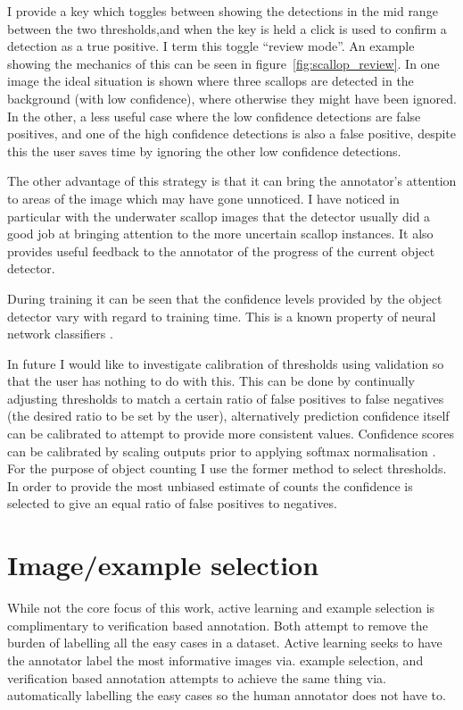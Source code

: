 I provide a key which toggles between showing the detections in the mid range between the two thresholds,and when the key is held a click is used to confirm a detection as a true positive. I term this toggle ``review mode''.  An example showing the mechanics of this can be seen in figure~\ref{fig:scallop_review}. In one image the ideal situation is shown where three scallops are detected in the background (with low confidence), where otherwise they might have been ignored. In the other, a less useful case where the low confidence detections are false positives, and one of the high confidence detections is also a false positive, despite this the user saves time by ignoring the other low confidence detections.

The other advantage of this strategy is that it can bring the annotator's attention to areas of the image which may have gone unnoticed. I have noticed in particular with the underwater scallop images that the detector usually did a good job at bringing attention to the more uncertain scallop instances. It also provides useful feedback to the annotator of the progress of the current object detector. 

During training it can be seen that the confidence levels provided by the object detector vary with regard to training time. This is a known property of neural network classifiers \cite{Guo2017}.

In future I would like to investigate calibration of thresholds using validation so that the user has nothing to do with this. This can be done by continually adjusting thresholds to match a certain ratio of false positives to false negatives (the desired ratio to be set by the user), alternatively prediction confidence itself can be calibrated to attempt to provide more consistent values. Confidence scores can be calibrated by scaling outputs prior to applying softmax normalisation \cite{Guo2017}. For the purpose of object counting I use the former method to select thresholds. In order to provide the most unbiased estimate of counts the confidence is selected to give an equal ratio of false positives to negatives.
 


\section{Image/example selection}
\label{sec:example_selection}

While not the core focus of this work, active learning and example selection is complimentary to verification based annotation. Both attempt to remove the burden of labelling all the easy cases in a dataset. Active learning seeks to have the annotator label the most informative images via. example selection, and verification based annotation attempts to achieve the same thing via. automatically labelling the easy cases so the human annotator does not have to. 

